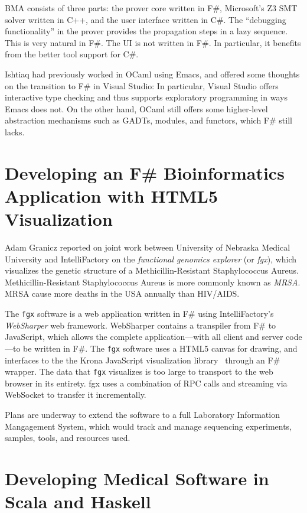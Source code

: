 \documentclass{jfp1}
\begin{document}
BMA consists of three parts: the prover core written in F\#,
Microsoft's Z3 SMT solver written in C++, and the user interface written in C\#.  The ``debugging functionality''
in the prover provides the propagation steps in a lazy sequence.  This
is very natural in F\#.  The UI is not written in F\#.  In particular,
it benefits from the better tool support for C\#.

Ishtiaq had previously worked in OCaml using Emacs, and offered some
thoughts on the transition to F\# in Visual Studio: In particular,
Visual Studio offers interactive type checking and thus supports
exploratory programming in ways Emacs does not.  On the other hand,
OCaml still offers some higher-level abstraction mechanisms such as
GADTs, modules, and functors, which F\# still lacks.

\section{Developing an F\# Bioinformatics Application with HTML5 Visualization}

Adam Granicz reported on joint work between University of Nebraska
Medical University and IntelliFactory on the \textit{functional
  genomics explorer} (or \textit{fgx}), which visualizes the genetic structure of a
Methicillin-Resistant Staphylococcus Aureus.  Methicillin-Resistant
Staphylococcus Aureus is more commonly known as \textit{MRSA}. MRSA
cause more deaths in the USA annually than HIV/AIDS.

The {\tt fgx} software is a web application written in F\# using
IntelliFactory's \textit{WebSharper} web framework.  WebSharper
contains a transpiler from F\# to JavaScript, which allows the
complete application---with all client and server code---to be
written in F\#.  The {\tt fgx} software uses a HTML5 canvas for drawing, and
interfaces to the the Krona JavaScript visualization
library~\cite{OndovBergmanPhilippy2011} through an F\# wrapper.  The
data that {\tt fgx} visualizes is too large to transport to the web browser
in its entirety.  fgx uses a combination of RPC calls and streaming via
WebSocket to transfer it incrementally.

Plans are underway to extend the software to a full Laboratory
Information Mangagement System, which would track and manage
sequencing experiments, samples, tools, and resources used.

\section{Developing Medical Software in Scala and Haskell}
\end{document}
